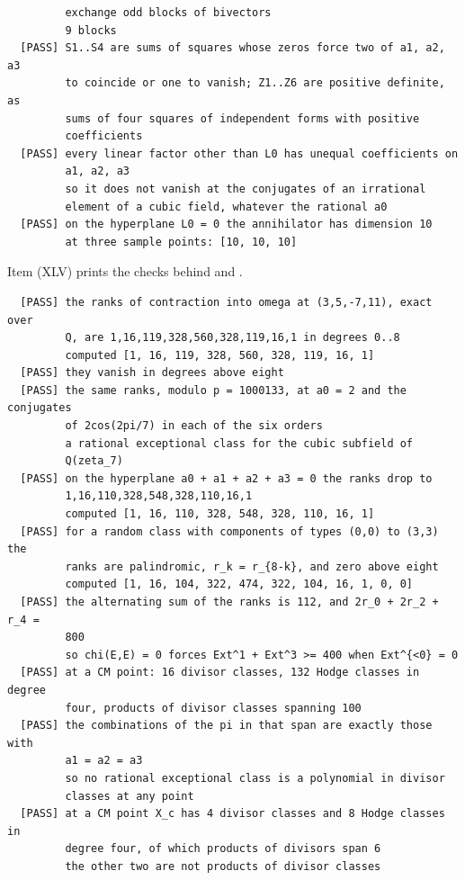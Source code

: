\begin{small}
\begin{verbatim}
         exchange odd blocks of bivectors
         9 blocks
  [PASS] S1..S4 are sums of squares whose zeros force two of a1, a2, a3
         to coincide or one to vanish; Z1..Z6 are positive definite, as
         sums of four squares of independent forms with positive
         coefficients
  [PASS] every linear factor other than L0 has unequal coefficients on
         a1, a2, a3
         so it does not vanish at the conjugates of an irrational
         element of a cubic field, whatever the rational a0
  [PASS] on the hyperplane L0 = 0 the annihilator has dimension 10
         at three sample points: [10, 10, 10]
\end{verbatim}
\end{small}

Item (XLV) prints the checks behind  and
.

\begin{small}
\begin{verbatim}
  [PASS] the ranks of contraction into omega at (3,5,-7,11), exact over
         Q, are 1,16,119,328,560,328,119,16,1 in degrees 0..8
         computed [1, 16, 119, 328, 560, 328, 119, 16, 1]
  [PASS] they vanish in degrees above eight
  [PASS] the same ranks, modulo p = 1000133, at a0 = 2 and the conjugates
         of 2cos(2pi/7) in each of the six orders
         a rational exceptional class for the cubic subfield of
         Q(zeta_7)
  [PASS] on the hyperplane a0 + a1 + a2 + a3 = 0 the ranks drop to
         1,16,110,328,548,328,110,16,1
         computed [1, 16, 110, 328, 548, 328, 110, 16, 1]
  [PASS] for a random class with components of types (0,0) to (3,3) the
         ranks are palindromic, r_k = r_{8-k}, and zero above eight
         computed [1, 16, 104, 322, 474, 322, 104, 16, 1, 0, 0]
  [PASS] the alternating sum of the ranks is 112, and 2r_0 + 2r_2 + r_4 =
         800
         so chi(E,E) = 0 forces Ext^1 + Ext^3 >= 400 when Ext^{<0} = 0
  [PASS] at a CM point: 16 divisor classes, 132 Hodge classes in degree
         four, products of divisor classes spanning 100
  [PASS] the combinations of the pi in that span are exactly those with
         a1 = a2 = a3
         so no rational exceptional class is a polynomial in divisor
         classes at any point
  [PASS] at a CM point X_c has 4 divisor classes and 8 Hodge classes in
         degree four, of which products of divisors span 6
         the other two are not products of divisor classes
\end{verbatim}
\end{small}

